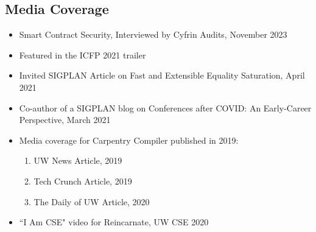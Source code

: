 \documentclass[margin, 10pt]{res} %
\begin{document}
\begin{resume}
\section{Media Coverage}
\begin{itemize}
  \item Smart Contract Security, Interviewed by Cyfrin Audits, November 2023
  \item Featured in the ICFP 2021 trailer
  \item Invited SIGPLAN Article on Fast and Extensible Equality Saturation, April 2021
  \item Co-author of a SIGPLAN blog on Conferences after COVID: An Early-Career Perspective, March 2021
  \item Media coverage for Carpentry Compiler published in 2019:
    \begin{enumerate}
      \item UW News Article, 2019
      \item Tech Crunch Article, 2019
      \item The Daily of UW Article, 2020
    \end{enumerate}
  \item ``I Am CSE" video for Reincarnate, UW CSE 2020
 \end{itemize}


\end{resume}
\end{document}
